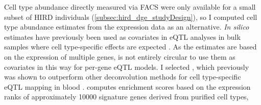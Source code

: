 Cell type abundance directly measured via \gls{FACS} were only available for a small subset of \gls{HIRD} individuals (\cref{subsec:hird_dge_studyDesign}), so I computed cell type abundance estimates from the expression data as an alternative.
\textit{In silico} estimates have previously been used as covariates in \gls{eQTL} analyses in bulk samples where cell type-specific effects are expected \autocite{westra2015CellSpecificEQTL,zhernakova2017IdentificationContextdependentExpression,davenport2018DiscoveringVivoCytokineeQTL,kim-hellmuth2020CellTypeSpecific}.
As the estimates are based on the expression of multiple genes, is not entirely circular to use them as covariates in this way for per-gene \gls{eQTL} models.
%
%
%
%
I selected  \autocite{aran2017XCellDigitallyPortraying}, which previously was shown to outperform other deconvolution methods for cell type-specific \gls{eQTL} mapping in blood \autocite{kim-hellmuth2020CellTypeSpecific}.
 computes enrichment scores based on the expression ranks of approximately \num{10000} signature genes derived from purified cell types,

